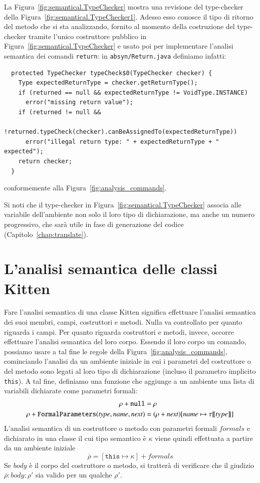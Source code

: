 La Figura~\ref{fig:semantical.TypeChecker} mostra una revisione del
type-checker della Figura~\ref{fig:semantical.TypeChecker1}.
Adesso esso conosce il tipo di ritorno del metodo che
si sta analizzando, fornito al momento della
costruzione del type-checker tramite l'unico costruttore pubblico
in Figura~\ref{fig:semantical.TypeChecker} e usato poi per
implementare l'analisi semantica dei comandi \texttt{return}: in
\texttt{absyn/Return.java} definiamo infatti:
%
\begin{verbatim}
  protected TypeChecker typeCheck$0(TypeChecker checker) {
    Type expectedReturnType = checker.getReturnType();
    if (returned == null && expectedReturnType != VoidType.INSTANCE)
      error("missing return value");
    if (returned != null &&
        !returned.typeCheck(checker).canBeAssignedTo(expectedReturnType))
      error("illegal return type: " + expectedReturnType + " expected");
    return checker;
  }
\end{verbatim}
conformemente alla Figura~\ref{fig:analysis_commands}.

Si noti che il type-checker in Figura~\ref{fig:semantical.TypeChecker} associa
alle variabile dell'ambiente non solo il loro tipo di dichiarazione,
ma anche un numero progressivo, che sar\`a utile in fase di generazione del
codice (Capitolo~\ref{chap:translate}).
%
\section{L'analisi semantica delle classi Kitten}
  \label{sec:analysis_classes}
%
Fare l'analisi semantica di una classe Kitten significa effettuare
l'analisi semantica dei suoi membri, \cioe campi, costruttori e metodi.
Nulla va controllato per quanto riguarda i campi. Per quanto riguarda
costruttori e metodi, invece, occorre effettuare l'analisi semantica
del loro corpo. Essendo il loro corpo un comando, possiamo usare a tal
fine le regole della Figura~\ref{fig:analysis_commands}, cominciando
l'analisi da un ambiente iniziale in cui i parametri del costruttore o del
metodo sono legati al loro tipo di dichiarazione (incluso il parametro
implicito \texttt{this}). A tal fine, definiamo una funzione che
aggiunge a un ambiente una lista di variabili dichiarate come parametri
formali:
%
\begin{align*}
  \rho+{\mathtt{null}}&=\rho \\
  \rho+{\mathtt{FormalParameters(\mathit{type},\mathit{name},\mathit{next})}}&=(\rho+{\mathit{next}})[\mathit{name}\mapsto{\tau[\![{type}]\!]}]
\end{align*}
%
L'analisi semantica di un costruttore o metodo con parametri formali
$\mathit{formals}$ e dichiarato in una classe
il cui tipo semantico \`e $\kappa$ viene quindi effettuata
a partire da un ambiente iniziale
\[
  \overline{\rho}=[\mathtt{this}\mapsto\kappa]+{\mathit{formals}}
\]
Se $\mathit{body}$ \`e il corpo del costruttore o metodo, si tratter\`a
di verificare che il giudizio $\overline{\rho}:\mathit{body}:\rho'$ sia
valido per un qualche $\rho'$.


